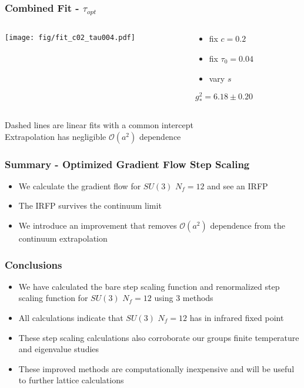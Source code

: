 \begin{frame}
  \frametitle{Combined Fit - $\tau_{opt}$}
  \begin{columns}[T]
    \begin{column}{.7\textwidth}
      \texttt{[image: fig/fit\_c02\_tau004.pdf]}
    \end{column}
    \begin{column}{.3\textwidth}
      \begin{itemize}
        \item fix $c=0.2$
        \item fix $\tau_0=0.04$
        \item vary $s$
      \end{itemize}
      \vspace{24pt}
      $g^2_*=6.18\pm0.20$
    \end{column}
  \end{columns}
  \vspace{12pt}
  Dashed lines are linear fits with a common intercept\\
  Extrapolation has negligible $\mathcal{O}(a^2)$ dependence
\end{frame}

\begin{frame}
  \frametitle{Summary - Optimized Gradient Flow Step Scaling}
  \begin{itemize}
    \item We calculate the gradient flow for $SU(3)$ $N_f=12$ and see an IRFP
    \item The IRFP survives the continuum limit
    \item We introduce an improvement that removes $\mathcal{O}(a^2)$ dependence
from the continuum extrapolation
  \end{itemize}
\end{frame}

\begin{frame}
  \frametitle{Conclusions}
  \begin{itemize}
    \item We have calculated the bare step scaling function and renormalized step scaling function for $SU(3)$ $N_f=12$ using 3 methods
    \item All calculations indicate that $SU(3)$ $N_f=12$ has in infrared fixed point
    \item These step scaling calculations also corroborate our groups finite temperature and eigenvalue studies
    \item These improved methods are computationally inexpensive and will be useful to further lattice calculations
  \end{itemize}
\end{frame}

